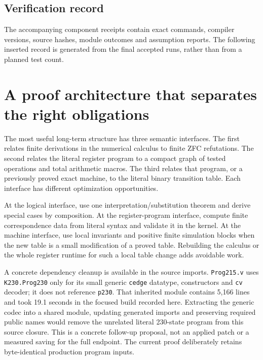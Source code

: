 \documentclass[11pt,letterpaper]{article}
\theoremstyle{definition}\newtheorem{definition}[theorem]{Definition}
\begin{document}
\subsection{Verification record}

The accompanying component receipts contain exact commands, compiler versions,
source hashes, module outcomes and assumption reports. The following inserted
record is generated from the final accepted runs, rather than from a planned
test count.



\section{A proof architecture that separates the right obligations}

The most useful long-term structure has three semantic interfaces. The first
relates finite derivations in the numerical calculus to finite ZFC
refutations. The second relates the literal register program to a compact
graph of tested operations and total arithmetic macros. The third relates
that program, or a previously proved exact machine, to the literal binary
transition table. Each interface has different optimization opportunities.

At the logical interface, use one interpretation/substitution theorem and
derive special cases by composition. At the register-program interface,
compute finite correspondence data from literal syntax and validate it in the
kernel. At the machine interface, use local invariants and positive finite
simulation blocks when the new table is a small modification of a proved table.
Rebuilding the calculus or the whole register runtime for such a local table
change adds avoidable work.

A concrete dependency cleanup is available in the source imports.
\texttt{Prog215.v} uses \texttt{K230.Prog230} only for its small generic
\texttt{cedge} datatype, constructors and \texttt{cv} decoder; it does not
reference \texttt{p230}. That inherited module contains 5,166 lines and took
19.1 seconds in the focused build recorded here. Extracting the generic codec
into a shared module, updating generated imports and preserving required
public names would remove the unrelated literal 230-state program from this
source closure. This is a concrete follow-up proposal, not an applied patch
or a measured saving for the full endpoint. The current proof deliberately
retains byte-identical production program inputs.
\end{document}
